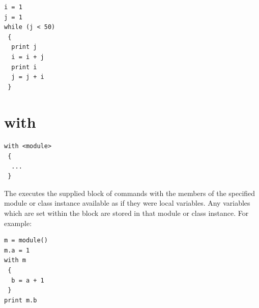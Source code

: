 \begin{verbatim}
i = 1
j = 1
while (j < 50)
 {
  print j
  i = i + j
  print i
  j = j + i
 }
\end{verbatim}


\section{with}

\begin{verbatim}
with <module>
 {
  ...
 }
\end{verbatim}

The  executes the supplied block of commands with the members of
the specified module or class instance available as if they were local
variables. Any variables which are set within the block are stored in that
module or class instance. For example:

\begin{verbatim}
m = module()
m.a = 1
with m
 {
  b = a + 1
 }
print m.b
\end{verbatim}


